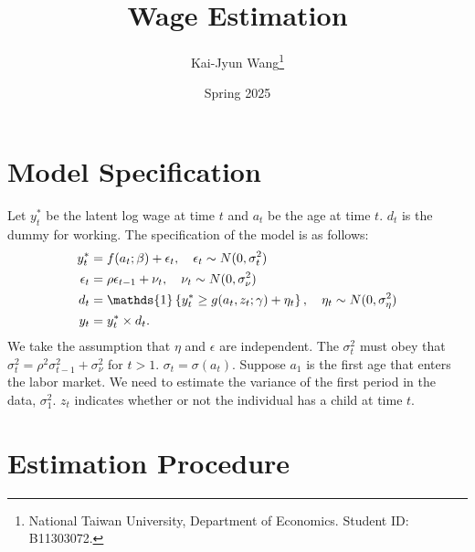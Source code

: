 \documentclass[a4paper, 12pt]{article}
\title{Wage Estimation}
\author{Kai-Jyun Wang\thanks{National Taiwan University, Department of Economics. Student ID: B11303072.}}
\date{Spring 2025}
\begin{document}
\maketitle

\section{Model Specification}
Let $y^*_t$ be the latent log wage at time $t$ and $a_t$ be the age at time $t$. $d_t$ 
is the dummy for working. The specification of the model is as follows: 
\begin{align*}
    y^*_t &= f(a_t;\beta) + \epsilon_t, \quad \epsilon_t \sim N(0, \sigma_t^2) \\
    \epsilon_t &= \rho\epsilon_{t-1} + \nu_t, \quad \nu_t \sim N(0, \sigma_\nu^2) \\
    d_t &= \mathds{1}\brc{y_t^* \geq g(a_t,z_t;\gamma) + \eta_t}, \quad \eta_t \sim N(0, \sigma_\eta^2) \\ 
    y_t &= y^*_t \times d_t. 
\end{align*}
We take the assumption that $\eta$ and $\epsilon$ are independent. The $\sigma_t^2$ must 
obey that $\sigma_t^2 = \rho^2 \sigma_{t-1}^2 + \sigma_\nu^2$ for $t > 1$. $\sigma_t = 
\sigma(a_t)$. Suppose $a_1$ is the first age that enters the labor market. We need to 
estimate the variance of the first period in the data, $\sigma_1^2$. $z_t$ indicates whether 
or not the individual has a child at time $t$.  

\section{Estimation Procedure}
\end{document}
